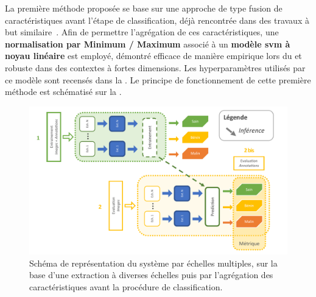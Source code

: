 La première méthode proposée se base sur une approche de type fusion de caractéristiques avant l'étape de classification, déjà rencontrée dans des travaux à but similaire~\cite{Pedersoli2011,Alsaih2016}. Afin de permettre l'agrégation de ces caractéristiques, une \textbf{normalisation par Minimum / Maximum} associé à un \textbf{modèle \gls{svm} à noyau linéaire} est employé, démontré efficace de manière empirique lors du  et robuste dans des contextes à fortes dimensions. Les hyperparamètres utilisés par ce modèle sont recensés dans la . Le principe de fonctionnement de cette première méthode est schématisé sur la .\par

\begin{figure}[H]
    \centering
    \includegraphics[width=0.95\linewidth]{contents/chapter_6/resources/scheme_image_improvement_multiscale_features.pdf}
    \caption{Schéma de représentation du système par échelles multiples, sur la base d'une extraction à diverses échelles puis par l'agrégation des caractéristiques avant la procédure de classification.}
    \label{fig:scheme_image_improvement_multiscale_features}
\end{figure}\par

